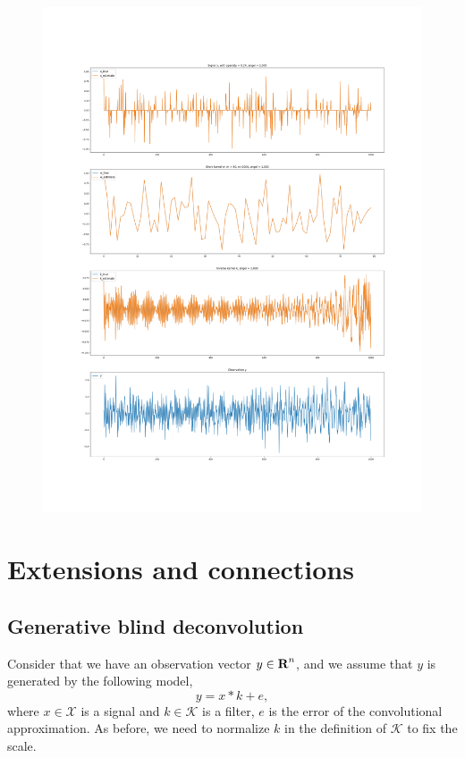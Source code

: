 \documentclass[12pt]{article}
\begin{document}
\begin{figure}
  \includegraphics[width=17cm,keepaspectratio]{fig5/bShort_lenKnown_xSparse_w_Gaus_Ano_n1000_k80_p0_24_sigma0_00.png}
\end{figure}
 
\section{Extensions and connections}
\subsection{Generative blind deconvolution }
Consider that we have an observation vector $y\in {\mbox{\bf R}}^n$, and we assume that $y$ is generated by the following model,
\[
y=x*k + e,
\]
where $x\in \mathcal X$ is a signal and $k\in \mathcal K$ is a filter, $e$ is the error of the convolutional approximation. As before, we need to normalize $k$ in the definition of $\mathcal K$ to fix the scale.
\end{document}

